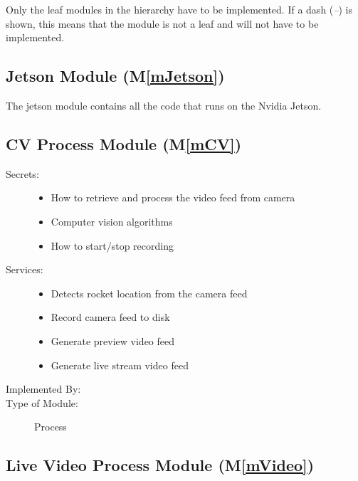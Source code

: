 \documentclass[12pt, titlepage]{article}
\newcommand{\mref}[1]{M\ref{#1}}
\begin{document}
Only the leaf modules in the hierarchy have to be implemented. If a dash
(\emph{--}) is shown, this means that the module is not a leaf and will not
have to be implemented.

\subsection{Jetson Module (\mref{mJetson})}

The jetson module contains all the code that runs on the Nvidia Jetson.

\subsection{CV Process Module (\mref{mCV})}

\begin{description}
  \item[Secrets:] \leavevmode
        \begin{itemize}
          \item How to retrieve and process the video feed from camera
          \item Computer vision algorithms
          \item How to start/stop recording
        \end{itemize}
  \item[Services:] \leavevmode
        \begin{itemize}
          \item Detects rocket location from the camera feed
          \item Record camera feed to disk
          \item Generate preview video feed
          \item Generate live stream video feed
        \end{itemize}
  \item[Implemented By:] \progname
  \item[Type of Module:] Process
\end{description}

\subsection{Live Video Process Module (\mref{mVideo})}
\end{document}
